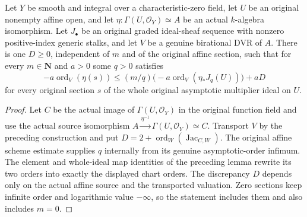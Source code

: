 \begin{theorem}
\label{thm:c0n-scheme-estimate-chart-coordinates}
\leanok
Let $Y$ be smooth and integral over a characteristic-zero field, let
$U$ be an original nonempty affine open, and let
$\eta:\Gamma(U,\mathcal O_Y)\simeq A$ be an actual $k$-algebra isomorphism.
Let $J_\bullet$ be an original graded ideal-sheaf sequence with nonzero
positive-index generic stalks, and let $V$ be a genuine birational DVR
of $A$.
There is one $D\ge0$, independent of $m$ and of the original affine
section, such that for every $m\in\mathbf N$ and $a>0$ some $q>0$ satisfies
\[
 -a\operatorname{ord}_V(\eta(s))\le
 (m/q)\bigl(-a\operatorname{ord}_V(\eta_*J_q(U))\bigr)+aD
\]
for every original section $s$ of the whole original asymptotic
multiplier ideal on $U$.
\end{theorem}
\begin{proof}
Let $C$ be the actual image of $\Gamma(U,\mathcal O_Y)$ in the original
function field and use the actual source isomorphism
$A\xrightarrow{\eta^{-1}}\Gamma(U,\mathcal O_Y)\simeq C$.
Transport $V$ by the preceding construction and put
$D=2+\operatorname{ord}_W(\operatorname{Jac}_{C,W})$.
The original affine scheme estimate supplies $q$ internally from its
genuine asymptotic-order infimum.  The element and whole-ideal map
identities of the preceding lemma rewrite its two orders into exactly
the displayed chart orders.  The discrepancy $D$ depends only on the
actual affine source and the transported valuation.  Zero sections keep
infinite order and logarithmic value $-\infty$, so the statement includes
them and also includes $m=0$.
\end{proof}
